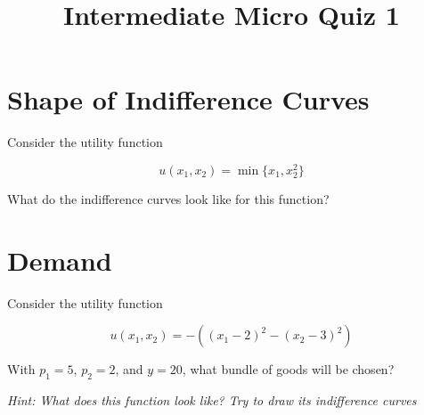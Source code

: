 \documentclass{article}
\begin{document}
\title{Intermediate Micro Quiz 1}

\maketitle

\section{Shape of Indifference Curves}

Consider the utility function

\[
u(x_1, x_2) = \min\{x_1, x_2^2\}
\]

What do the indifference curves look like for this function?

\section{Demand}

Consider the utility function

\[
u(x_1, x_2) = -\left((x_1 - 2)^2 - (x_2 - 3)^2\right)
\]

With $p_1 = 5$, $p_2 = 2$, and $y = 20$, what bundle of goods will be chosen?

\textit{Hint: What does this function look like? Try to draw its indifference curves}
\end{document}
